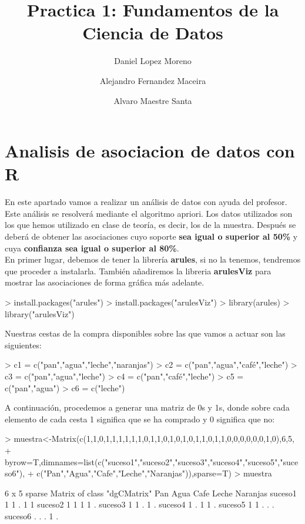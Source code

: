 \documentclass [a4paper] {article}
\title{Practica 1: Fundamentos de la Ciencia de Datos}
\author{
  Daniel Lopez Moreno\\
  \and
  Alejandro Fernandez Maceira\\
  \and
  Alvaro Maestre Santa
}
\begin{document}
\maketitle

\section{Analisis de asociacion de datos con R}
En este apartado vamos a realizar un análisis de datos con ayuda del profesor. 
Este análisis se resolverá mediante el algoritmo apriori. Los datos utilizados
son los que hemos utilizado en clase de teoría, es decir, los de la muestra. Después
se deberá de obtener las asociaciones cuyo soporte \textbf{sea igual o superior al 50\%} y cuya
\textbf{confianza sea igual o superior al 80\%}.\\
En primer lugar, debemos de tener la librería \textbf{arules}, si no la tenemos, tendremos que proceder a 
instalarla. También añadiremos la libreria \textbf{arulesViz} para mostrar las asociaciones de forma gráfica
más adelante.

\begin{Schunk}
\begin{Sinput}
> install.packages("arules")
> install.packages("arulesViz")
> library(arules)
> library("arulesViz")
\end{Sinput}
\end{Schunk}

Nuestras cestas de la compra disponibles sobre las que vamos a actuar son las siguientes:

\begin{Schunk}
\begin{Sinput}
> c1 = c("pan","agua","leche","naranjas")
> c2 = c("pan","agua","café","leche")
> c3 = c("pan","agua","leche")
> c4 = c("pan","café","leche")
> c5 = c("pan","agua")
> c6 = c("leche")
\end{Sinput}
\end{Schunk}

A continuación, procedemos a generar una matriz de 0s y 1s, donde sobre cada elemento de cada cesta 1 significa que se ha comprado y 0 
significa que no:

\begin{Schunk}
\begin{Sinput}
> muestra<-Matrix(c(1,1,0,1,1,1,1,1,1,0,1,1,0,1,0,1,0,1,1,0,1,1,0,0,0,0,0,0,1,0),6,5,
+ byrow=T,dimnames=list(c("suceso1","suceso2","suceso3","suceso4","suceso5","suceso6"),
+ c("Pan","Agua","Cafe","Leche","Naranjas")),sparse=T)
> muestra
\end{Sinput}
\begin{Soutput}
6 x 5 sparse Matrix of class "dgCMatrix"
        Pan Agua Cafe Leche Naranjas
suceso1   1    1    .     1        1
suceso2   1    1    1     1        .
suceso3   1    1    .     1        .
suceso4   1    .    1     1        .
suceso5   1    1    .     .        .
suceso6   .    .    .     1        .
\end{Soutput}
\end{Schunk}
\end{document}

